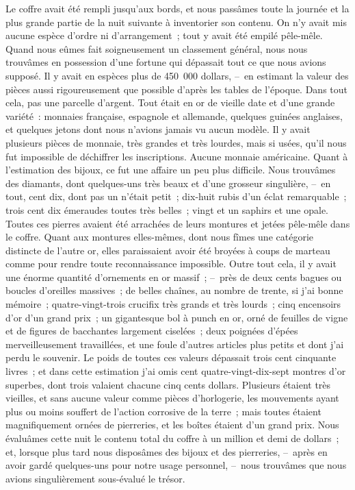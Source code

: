 \documentclass[french,twoside]{book} %
\begin{document}
Le coffre avait été rempli jusqu’aux bords, et nous passâmes toute la journée et la plus grande partie de la nuit suivante à inventorier son contenu. On n’y avait mis aucune espèce d’ordre ni d’arrangement ; tout y avait été empilé pêle-mêle. Quand nous eûmes fait soigneusement un classement général, nous nous trouvâmes en possession d’une fortune qui dépassait tout ce que nous avions supposé. Il y avait en espèces plus de 450 000 dollars, – en estimant la valeur des pièces aussi rigoureusement que possible d’après les tables de l’époque. Dans tout cela, pas une parcelle d’argent. Tout était en or de vieille date et d’une grande variété : monnaies française, espagnole et allemande, quelques guinées anglaises, et quelques jetons dont nous n’avions jamais vu aucun modèle. Il y avait plusieurs pièces de monnaie, très grandes et très lourdes, mais si usées, qu’il nous fut impossible de déchiffrer les inscriptions. Aucune monnaie américaine. Quant à l’estimation des bijoux, ce fut une affaire un peu plus difficile. Nous trouvâmes des diamants, dont quelques-uns très beaux et d’une grosseur singulière, – en tout, cent dix, dont pas un n’était petit ; dix-huit rubis d’un éclat remarquable ; trois cent dix émeraudes toutes très belles ; vingt et un saphirs et une opale. Toutes ces pierres avaient été arrachées de leurs montures et jetées pêle-mêle dans le coffre. Quant aux montures elles-mêmes, dont nous fîmes une catégorie distincte de l’autre or, elles paraissaient avoir été broyées à coups de marteau comme pour rendre toute reconnaissance impossible. Outre tout cela, il y avait une énorme quantité d’ornements en or massif ; – près de deux cents bagues ou boucles d’oreilles massives ; de belles chaînes, au nombre de trente, si j’ai bonne mémoire ; quatre-vingt-trois crucifix très grands et très lourds ; cinq encensoirs d’or d’un grand prix ; un gigantesque bol à punch en or, orné de feuilles de vigne et de figures de bacchantes largement ciselées ; deux poignées d’épées merveilleusement travaillées, et une foule d’autres articles plus petits et dont j’ai perdu le souvenir. Le poids de toutes ces valeurs dépassait trois cent cinquante livres ; et dans cette estimation j’ai omis cent quatre-vingt-dix-sept montres d’or superbes, dont trois valaient chacune cinq cents dollars. Plusieurs étaient très vieilles, et sans aucune valeur comme pièces d’horlogerie, les mouvements ayant plus ou moins souffert de l’action corrosive de la terre ; mais toutes étaient magnifiquement ornées de pierreries, et les boîtes étaient d’un grand prix. Nous évaluâmes cette nuit le contenu total du coffre à un million et demi de dollars ; et, lorsque plus tard nous disposâmes des bijoux et des pierreries, – après en avoir gardé quelques-uns pour notre usage personnel, – nous trouvâmes que nous avions singulièrement sous-évalué le trésor.\par
\end{document}
